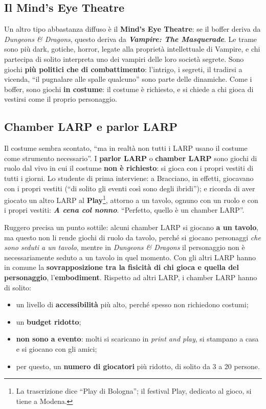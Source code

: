 \subsection{Il Mind's Eye Theatre}

Un altro tipo abbastanza diffuso è il \textbf{Mind's Eye Theatre}: se il boffer
deriva da \emph{Dungeons \& Dragons}, questo deriva da \textbf{\emph{Vampire: The
Masquerade}}. Le trame sono più dark, gotiche, horror, legate alla proprietà
intellettuale di Vampire, e chi partecipa di solito interpreta uno dei vampiri
delle loro società segrete. Sono giochi \textbf{più politici che di
combattimento}: l'intrigo, i segreti, il tradirsi a vicenda, ``il pugnalare
alle spalle qualcuno'' sono parte delle dinamiche. Come i boffer, sono giochi
\textbf{in costume}: il costume è richiesto, e si chiede a chi gioca di vestirsi
come il proprio personaggio.

\subsection{Chamber LARP e parlor LARP}

Il costume sembra scontato, ``ma in realtà non tutti i LARP usano il costume
come strumento necessario''. I \textbf{parlor LARP} o \textbf{chamber LARP}
sono giochi di ruolo dal vivo in cui il costume \textbf{non è richiesto}: si
gioca con i propri vestiti di tutti i giorni. Lo studente di prima interviene: a
Bracciano, in effetti, giocavano con i propri vestiti (``di solito gli eventi
così sono degli ibridi''); e ricorda di aver giocato un altro LARP al
\textbf{Play}\footnote{La trascrizione dice ``Play di Bologna''; il festival
Play, dedicato al gioco, si tiene a Modena.}, attorno a un tavolo, ognuno con un
ruolo e con i propri vestiti: \textbf{\emph{A cena col nonno}}. ``Perfetto, quello
è un chamber LARP''.

Ruggero precisa un punto sottile: alcuni chamber LARP si giocano \textbf{a un
tavolo}, ma questo non li rende giochi di ruolo da tavolo, perché si giocano
personaggi \emph{che sono seduti a un tavolo}, mentre in \emph{Dungeons \&
Dragons} il personaggio non è necessariamente seduto a un tavolo in quel momento.
Con gli altri LARP hanno in comune la \textbf{sovrapposizione tra la fisicità di
chi gioca e quella del personaggio}, l'\textbf{embodiment}. Rispetto ad altri
LARP, i chamber LARP hanno di solito:
\begin{itemize}
  \item un livello di \textbf{accessibilità} più alto, perché spesso non
        richiedono costumi;
  \item un \textbf{budget ridotto};
  \item \textbf{non sono a evento}: molti si scaricano in \emph{print and play},
        si stampano a casa e si giocano con gli amici;
  \item per questo, un \textbf{numero di giocatori} più ridotto, di solito da
        3 a 20 persone.
\end{itemize}

